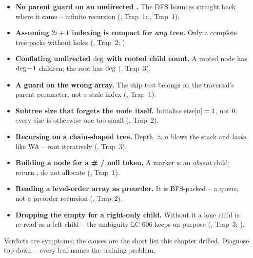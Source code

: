 \begin{itemize}[nosep, leftmargin=1.4em]
  \item \textbf{No parent guard on an undirected .} The DFS bounces straight
        back where it came -- infinite recursion (, Trap~1;
        , Trap~1).
  \item \textbf{Assuming $2i{+}1$ indexing is compact for \emph{any} tree.} Only a
        complete tree packs without holes (, Trap~2; ).
  \item \textbf{Conflating undirected $\operatorname{deg}$ with rooted child count.} A rooted node
        has $\operatorname{deg}-1$ children; the root has $\operatorname{deg}$ (, Trap~3).
  \item \textbf{A guard on the wrong array.} The skip test belongs on the traversal's
        parent parameter, not a stale index (, Trap~1).
  \item \textbf{Subtree size that forgets the node itself.} Initialise $\operatorname{size}[u]=1$, not
        $0$; every size is otherwise one too small (, Trap~2).
  \item \textbf{Recursing on a chain-shaped tree.} Depth $\approx n$ blows the stack and
        \emph{looks} like WA -- root iteratively (, Trap~3).
  \item \textbf{Building a node for a \# / null token.} A marker is an \emph{absent}
        child; return , do not allocate (, Trap~1).
  \item \textbf{Reading a level-order array as preorder.} It is BFS-packed -- a queue,
        not a preorder recursion (, Trap~2).
  \item \textbf{Dropping the empty \code{()} for a right-only child.} Without it a lone
        child is re-read as a left child -- the ambiguity LC 606 keeps on purpose
        (, Trap~3; ).
\end{itemize}


Verdicts are symptoms; the causes are the short list this chapter drilled. Diagnose
top-down -- every leaf names the training problem.

